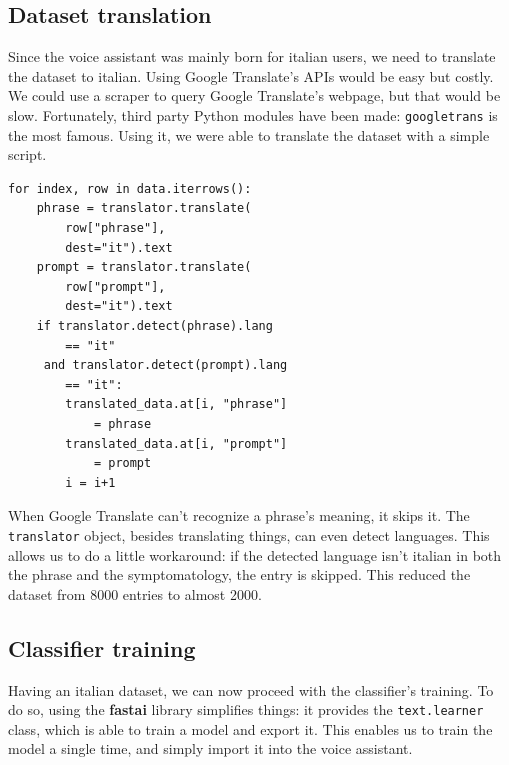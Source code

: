 \documentclass[conference]{IEEEtran}
\begin{document}
\subsection{Dataset translation}
Since the voice assistant was mainly born for italian users, we need to translate the dataset to italian. Using Google Translate's APIs would be easy but costly. We could use a scraper to query Google Translate's webpage, but that would be slow. Fortunately, third party Python modules have been made: \texttt{googletrans} is the most famous. Using it, we were able to translate the dataset with a simple script.
\begin{verbatim}
for index, row in data.iterrows():
    phrase = translator.translate(
        row["phrase"], 
        dest="it").text
    prompt = translator.translate(
        row["prompt"],
        dest="it").text
    if translator.detect(phrase).lang 
        == "it"
     and translator.detect(prompt).lang 
        == "it":
        translated_data.at[i, "phrase"]
            = phrase 
        translated_data.at[i, "prompt"]
            = prompt 
        i = i+1
\end{verbatim}
When Google Translate can't recognize a phrase's meaning, it skips it. The \texttt{translator} object, besides translating things, can even detect languages. This allows us to do a little workaround: if the detected language isn't italian in both the phrase and the symptomatology, the entry is skipped. This reduced the dataset from 8000 entries to almost 2000.
\subsection{Classifier training}
Having an italian dataset, we can now proceed with the classifier's training. To do so, using the \textbf{fastai} library simplifies things: it provides the \texttt{text.learner} class, which is able to train a model and export it. This enables us to train the model a single time, and simply import it into the voice assistant.
\end{document}
